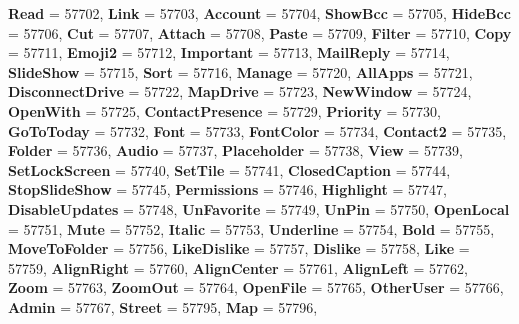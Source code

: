 \begin{DoxyCompactItemize}
{\bfseries Read} = 57702, 
{\bfseries Link} = 57703, 
\newline
{\bfseries Account} = 57704, 
{\bfseries Show\+Bcc} = 57705, 
{\bfseries Hide\+Bcc} = 57706, 
{\bfseries Cut} = 57707, 
\newline
{\bfseries Attach} = 57708, 
{\bfseries Paste} = 57709, 
{\bfseries Filter} = 57710, 
{\bfseries Copy} = 57711, 
\newline
{\bfseries Emoji2} = 57712, 
{\bfseries Important} = 57713, 
{\bfseries Mail\+Reply} = 57714, 
{\bfseries Slide\+Show} = 57715, 
\newline
{\bfseries Sort} = 57716, 
{\bfseries Manage} = 57720, 
{\bfseries All\+Apps} = 57721, 
{\bfseries Disconnect\+Drive} = 57722, 
\newline
{\bfseries Map\+Drive} = 57723, 
{\bfseries New\+Window} = 57724, 
{\bfseries Open\+With} = 57725, 
{\bfseries Contact\+Presence} = 57729, 
\newline
{\bfseries Priority} = 57730, 
{\bfseries Go\+To\+Today} = 57732, 
{\bfseries Font} = 57733, 
{\bfseries Font\+Color} = 57734, 
\newline
{\bfseries Contact2} = 57735, 
{\bfseries Folder} = 57736, 
{\bfseries Audio} = 57737, 
{\bfseries Placeholder} = 57738, 
\newline
{\bfseries View} = 57739, 
{\bfseries Set\+Lock\+Screen} = 57740, 
{\bfseries Set\+Tile} = 57741, 
{\bfseries Closed\+Caption} = 57744, 
\newline
{\bfseries Stop\+Slide\+Show} = 57745, 
{\bfseries Permissions} = 57746, 
{\bfseries Highlight} = 57747, 
{\bfseries Disable\+Updates} = 57748, 
\newline
{\bfseries Un\+Favorite} = 57749, 
{\bfseries Un\+Pin} = 57750, 
{\bfseries Open\+Local} = 57751, 
{\bfseries Mute} = 57752, 
\newline
{\bfseries Italic} = 57753, 
{\bfseries Underline} = 57754, 
{\bfseries Bold} = 57755, 
{\bfseries Move\+To\+Folder} = 57756, 
\newline
{\bfseries Like\+Dislike} = 57757, 
{\bfseries Dislike} = 57758, 
{\bfseries Like} = 57759, 
{\bfseries Align\+Right} = 57760, 
\newline
{\bfseries Align\+Center} = 57761, 
{\bfseries Align\+Left} = 57762, 
{\bfseries Zoom} = 57763, 
{\bfseries Zoom\+Out} = 57764, 
\newline
{\bfseries Open\+File} = 57765, 
{\bfseries Other\+User} = 57766, 
{\bfseries Admin} = 57767, 
{\bfseries Street} = 57795, 
\newline
{\bfseries Map} = 57796, 

\end{DoxyCompactItemize}
